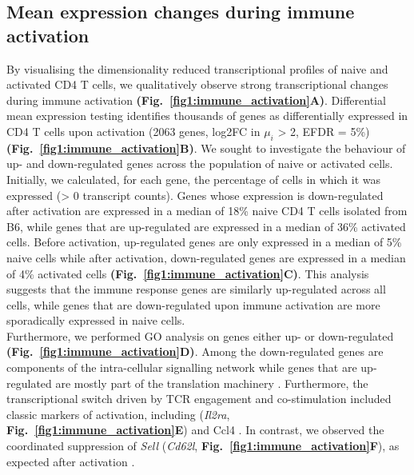 \subsection{Mean expression changes during immune activation}

By visualising the dimensionality reduced transcriptional profiles of naive and activated CD4\plus{} T cells, we qualitatively observe strong transcriptional changes during immune activation \textbf{(Fig.~\ref{fig1:immune_activation}A)}. 
Differential mean expression testing identifies thousands of genes as differentially expressed in CD4\plus{} T cells upon activation (2063 genes, log2FC in $\mu_i$ > 2, EFDR = 5\%) \textbf{(Fig.~\ref{fig1:immune_activation}B)}. 
We sought to investigate the behaviour of up- and down-regulated genes across the population of naive or activated cells. 
Initially, we calculated, for each gene, the percentage of cells in which it was expressed (> 0 transcript counts). 
Genes whose expression is down-regulated after activation are expressed in a median of 18\% naive CD4\plus{} T cells isolated from B6, while genes that are up-regulated are expressed in a median of 36\% activated cells. 
Before activation, up-regulated genes are only expressed in a median of 5\% naive cells while after activation, down-regulated genes are expressed in a median of 4\% activated cells \textbf{(Fig.~\ref{fig1:immune_activation}C)}. 
This analysis suggests that the immune response genes are similarly up-regulated across all cells, while genes that are down-regulated upon immune activation are more sporadically expressed in naive cells. \\

Furthermore, we performed GO analysis on genes either up- or down-regulated \textbf{(Fig.~\ref{fig1:immune_activation}D)}. 
Among the down-regulated genes are components of the intra-cellular signalling network while genes that are up-regulated are mostly part of the translation machinery \citep{Bjur2013}. 
Furthermore, the transcriptional switch driven by TCR engagement and co-stimulation included classic markers of activation, including (\textit{\gls{Il2ra}}, \textbf{Fig.~\ref{fig1:immune_activation}E}) and \gls{Ccl4} \citep{Asmal2003}. 
In contrast, we observed the coordinated suppression of \textit{Sell} (\textit{Cd62l}, \textbf{Fig.~\ref{fig1:immune_activation}F}), as expected after activation \citep{Park2005}.

\newpage

